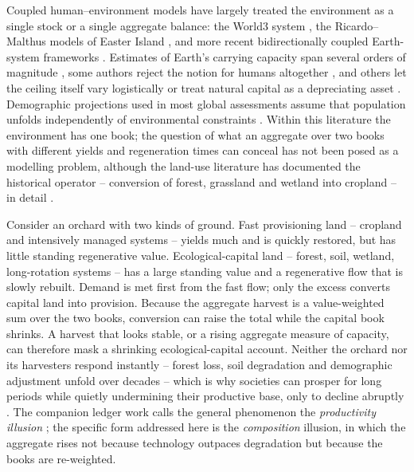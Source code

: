 \documentclass[preprint,12pt,authoryear]{elsarticle}
\begin{document}
Coupled human--environment models have largely treated the environment as a single stock or a single aggregate balance: the World3 system \citep{Meadows1972,Meadows1974,Meadows2004}, the Ricardo--Malthus models of Easter Island \citep{BranderTaylor1998,Anderies2000}, and more recent bidirectionally coupled Earth-system frameworks \citep{Motesharrei2016,Donges2017,CalvinBondLamberty2018,HendersonLoreau2018}. Estimates of Earth's carrying capacity span several orders of magnitude \citep{Cohen1995,vdBerghRietveld2004}, some authors reject the notion for humans altogether \citep{Simon1996}, and others let the ceiling itself vary logistically \citep{Meyer1994,MeyerAusubel1999} or treat natural capital as a depreciating asset \citep{Dasgupta2021}. Demographic projections used in most global assessments assume that population unfolds independently of environmental constraints \citep{UN2022}. Within this literature the environment has one book; the question of what an aggregate over two books with different yields and regeneration times can conceal has not been posed as a modelling problem, although the land-use literature has documented the historical operator -- conversion of forest, grassland and wetland into cropland -- in detail \citep{Haberl2007,Krausmann2013,Erb2017}.

Consider an orchard with two kinds of ground. Fast provisioning land -- cropland and intensively managed systems -- yields much and is quickly restored, but has little standing regenerative value. Ecological-capital land -- forest, soil, wetland, long-rotation systems -- has a large standing value and a regenerative flow that is slowly rebuilt. Demand is met first from the fast flow; only the excess converts capital land into provision. Because the aggregate harvest is a value-weighted sum over the two books, conversion can raise the total while the capital book shrinks. A harvest that looks stable, or a rising aggregate measure of capacity, can therefore mask a shrinking ecological-capital account. Neither the orchard nor its harvesters respond instantly -- forest loss, soil degradation and demographic adjustment unfold over decades -- which is why societies can prosper for long periods while quietly undermining their productive base, only to decline abruptly \citep{Tainter1988,Diamond2005}. The companion ledger work calls the general phenomenon the \emph{productivity illusion} \citep{Abaee2026c}; the specific form addressed here is the \emph{composition} illusion, in which the aggregate rises not because technology outpaces degradation but because the books are re-weighted.
\end{document}

